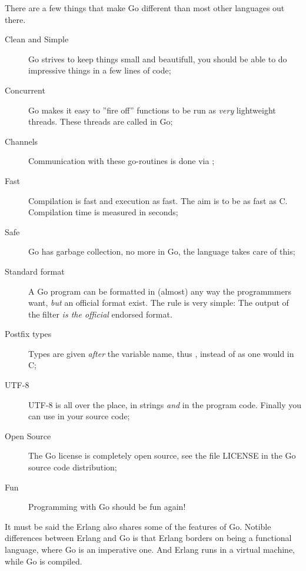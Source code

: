 \noindent{}There are a few things that make Go different than most other
languages out there.
\begin{description}
\item[Clean and Simple]
Go strives to keep things small and beautifull, you should
be able to do impressive things in a few lines of code;
\item[Concurrent]
Go makes it easy to ''fire off'' functions to be
run as \emph{very} lightweight threads. These threads are called
 in Go;

\item[Channels] 
Communication with these go-routines is done
via  \cite{csp}\cite{hoare};

\item[Fast]
Compilation is fast and execution as fast. The aim is
to be as fast as C. Compilation time is measured in seconds;

\item[Safe]
Go has garbage collection, no more  in Go,
the language takes care of this;

\item[Standard format]
A Go program can be formatted in (almost) any way the programmmers want,
\emph{but} an official format exist. The rule is very simple:
The output of the filter  \emph{is the official} endorsed
format.

\item[Postfix types]
Types are given \emph{after} the variable name, thus ,
instead of  as one would in C;

\item[UTF-8]
UTF-8 is all over the place, in strings
\emph{and} in the program code. Finally you can use  in your source code;

\item[Open Source]
The Go license is completely open source, see the file LICENSE in the Go
source code distribution;

\item[Fun]
Programming with Go should be fun again!

\end{description}
It must be said the Erlang \cite{erlang} also shares some
of the features of Go. Notible differences between Erlang
and Go is that Erlang borders on being a functional language,
where Go is an imperative one. And Erlang runs in a virtual
machine, while Go is compiled. 

